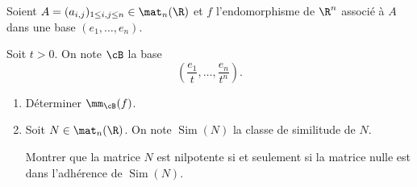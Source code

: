 \begin{enonce}
\begin{exercise}[ID={RMS135 E1443},subtitle={IMT MP 2024},tags={},difficulty={}]

Soient $A = (a_{i,j})_{1 \leq i,j \leq n} \in \mat_n(\R)$ et $f$ l’endomorphisme de $\R^n$ associé à $A$ dans une base $(e_1, \dots, e_n)$.

Soit $t > 0$.
On note $\cB$ la base
\begin{equation*}
\left( \frac{e_1}{t},\dots,\frac{e_n}{t^n} \right).
\end{equation*}
\begin{enumerate}
  \item Déterminer $\mm_{\cB}(f)$.
  \item Soit $N \in \mat_n(\R)$.
    On note $\operatorname{Sim}(N)$ la classe de similitude de $N$.

    Montrer que la matrice $N$ est nilpotente si et seulement si la matrice nulle est dans l’adhérence de $\operatorname{Sim}(N)$.
\end{enumerate}

\end{exercise}
\begin{solution}
\end{solution}
\end{enonce}
